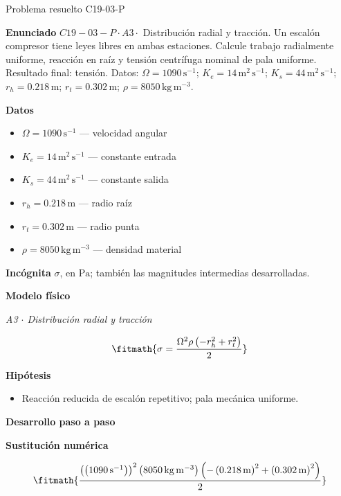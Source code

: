 \documentclass[10pt,openany]{book}
\begin{document}
\begin{studiumworked}{Problema resuelto C19-03-P}


\noindent\textbf{Enunciado}
\(C19-03-P \cdot A3 \cdot\) Distribución radial y tracción. Un escalón compresor tiene leyes libres en ambas estaciones. Calcule trabajo radialmente uniforme, reacción en raíz y tensión centrífuga nominal de pala uniforme. Resultado final: tensión. Datos: \(\Omega=1090\, \mathrm{s}^{-1}\); \(K_e=14\, \mathrm{m}^{2}\,\mathrm{s}^{-1}\); \(K_s=44\, \mathrm{m}^{2}\,\mathrm{s}^{-1}\); \(r_h=0.218\, \mathrm{m}\); \(r_t=0.302\, \mathrm{m}\); \(\rho=8050\, \mathrm{kg}\,\mathrm{m}^{-3}\).

\noindent\textbf{Datos}
\begin{itemize}
\item $\Omega = 1090\,\mathrm{s}^{-1}$ — velocidad angular
\item $K_e = 14\,\mathrm{m}^{2}\,\mathrm{s}^{-1}$ — constante entrada
\item $K_s = 44\,\mathrm{m}^{2}\,\mathrm{s}^{-1}$ — constante salida
\item $r_h = 0.218\,\mathrm{m}$ — radio raíz
\item $r_t = 0.302\,\mathrm{m}$ — radio punta
\item $\rho = 8050\,\mathrm{kg}\,\mathrm{m}^{-3}$ — densidad material
\end{itemize}

\noindent\textbf{Incógnita}
$\sigma$, en $\mathrm{Pa}$; también las magnitudes intermedias desarrolladas.

\noindent\textbf{Modelo físico}

\noindent\textit{A3 \(\cdot\) Distribución radial y tracción}

\[
\fitmath{\sigma=\frac{\Omega^{2} \rho \left(- r_h^{2} + r_t^{2}\right)}{2}}
\]

\noindent\textbf{Hipótesis}
\begin{itemize}
\item Reacción reducida de escalón repetitivo; pala mecánica uniforme.
\end{itemize}

\noindent\textbf{Desarrollo paso a paso}



\noindent\textbf{Sustitución numérica}

\[
\fitmath{\frac{\left(\left(1090\,\mathrm{s}^{-1}\right)\right)^{2} \left(8050\,\mathrm{kg}\,\mathrm{m}^{-3}\right) \left(- \left(0.218\,\mathrm{m}\right)^{2} + \left(0.302\,\mathrm{m}\right)^{2}\right)}{2}}
\]


\end{studiumworked}
\end{document}
